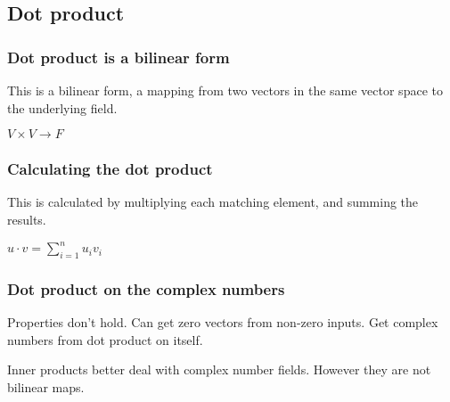 
\subsection{Dot product}

\subsubsection{Dot product is a bilinear form}

This is a bilinear form, a mapping from two vectors in the same vector space to the underlying field.

\(V\times V \rightarrow F\)

\subsubsection{Calculating the dot product}

This is calculated by multiplying each matching element, and summing the results.

\(u\cdot v =\sum_{i=1}^nu_iv_i\)

\subsubsection{Dot product on the complex numbers}

Properties don't hold. Can get zero vectors from non-zero inputs. Get complex numbers from dot product on itself.

Inner products better deal with complex number fields. However they are not bilinear maps.

